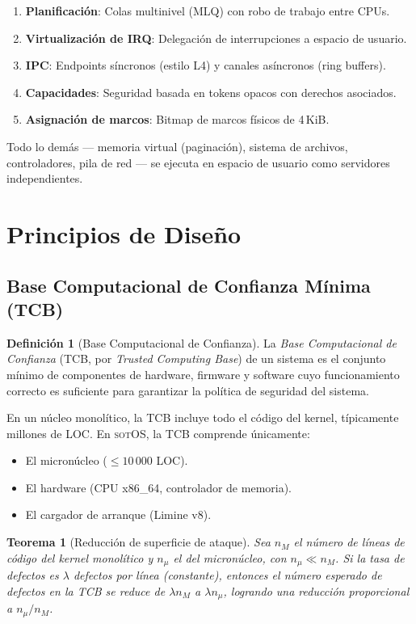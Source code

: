 \documentclass[11pt,twoside,openright]{book}
\theoremstyle{definition}
\newtheorem{definition}{Definición}[chapter]
\theoremstyle{plain}
\newtheorem{theorem}{Teorema}[chapter]
\theoremstyle{remark}
\newcommand{\sotos}{\textsc{sotOS}}
\begin{document}
\begin{enumerate}
    \item \textbf{Planificación}: Colas multinivel (MLQ) con robo de trabajo entre CPUs.
    \item \textbf{Virtualización de IRQ}: Delegación de interrupciones a espacio de usuario.
    \item \textbf{IPC}: Endpoints síncronos (estilo L4) y canales asíncronos (ring buffers).
    \item \textbf{Capacidades}: Seguridad basada en tokens opacos con derechos asociados.
    \item \textbf{Asignación de marcos}: Bitmap de marcos físicos de 4\,KiB.
\end{enumerate}

Todo lo demás --- memoria virtual (paginación), sistema de archivos, controladores,
pila de red --- se ejecuta en espacio de usuario como servidores independientes.

\section{Principios de Diseño}

\subsection{Base Computacional de Confianza Mínima (TCB)}

\begin{definition}[Base Computacional de Confianza]
\label{def:tcb}
La \emph{Base Computacional de Confianza} (TCB, por \emph{Trusted Computing Base}) de un
sistema es el conjunto mínimo de componentes de hardware, firmware y software cuyo
funcionamiento correcto es suficiente para garantizar la política de seguridad del sistema.
\end{definition}

En un núcleo monolítico, la TCB incluye todo el código del kernel, típicamente millones
de LOC. En \sotos{}, la TCB comprende únicamente:

\begin{itemize}
    \item El micronúcleo ($\leq 10\,000$ LOC).
    \item El hardware (CPU x86\_64, controlador de memoria).
    \item El cargador de arranque (Limine v8).
\end{itemize}

\begin{theorem}[Reducción de superficie de ataque]
\label{thm:tcb-reduction}
Sea $n_M$ el número de líneas de código del kernel monolítico y $n_\mu$ el del micronúcleo,
con $n_\mu \ll n_M$. Si la tasa de defectos es $\lambda$ defectos por línea (constante),
entonces el número esperado de defectos en la TCB se reduce de $\lambda n_M$ a
$\lambda n_\mu$, logrando una reducción proporcional a $n_\mu / n_M$.
\end{theorem}
\end{document}
